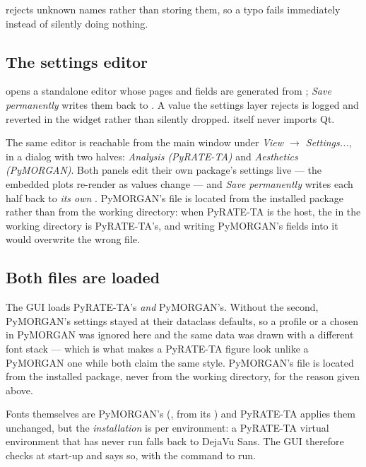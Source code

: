 rejects unknown names rather than storing them, so a
typo fails immediately instead of silently doing nothing.

\subsection{The settings editor}

 opens a standalone editor whose pages and fields
are generated from ; \emph{Save permanently} writes them
back to . A value the settings layer rejects is logged and
reverted in the widget rather than silently dropped.  itself
never imports Qt.

The same editor is reachable from the main window under
\emph{View $\rightarrow$ Settings...}, in a dialog with two halves:
\emph{Analysis (PyRATE-TA)} and \emph{Aesthetics (PyMORGAN)}. Both panels edit
their own package's settings live --- the embedded plots re-render as values
change --- and \emph{Save permanently} writes each half back to \emph{its own}
. PyMORGAN's file is located from the installed package
rather than from the working directory: when PyRATE-TA is the host, the
 in the working directory is PyRATE-TA's, and writing
PyMORGAN's fields into it would overwrite the wrong file.

\subsection{Both files are loaded}

The GUI loads PyRATE-TA's  \emph{and} PyMORGAN's. Without the
second, PyMORGAN's settings stayed at their dataclass defaults, so a profile or
a  chosen in PyMORGAN was ignored here and the same data was
drawn with a different font stack --- which is what makes a PyRATE-TA figure look
unlike a PyMORGAN one while both claim the same style. PyMORGAN's file is
located from the installed package, never from the working directory, for the
reason given above.

Fonts themselves are PyMORGAN's (, from
its ) and PyRATE-TA applies them unchanged, but the
\emph{installation} is per environment: a PyRATE-TA virtual environment that has
never run  falls back to DejaVu Sans. The GUI
therefore checks at start-up and says so, with the command to run.

